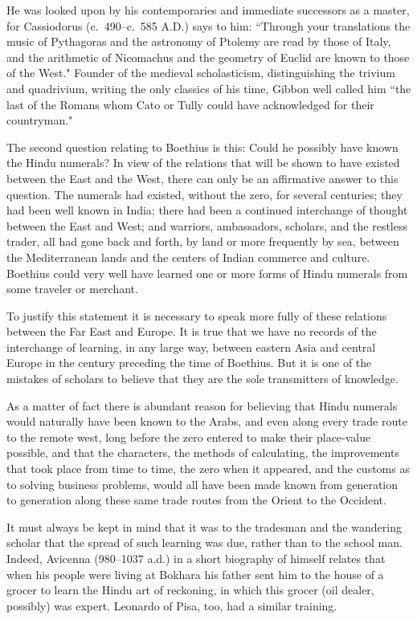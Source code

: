 \documentclass[11pt,a4paper]{article}
\begin{document}
He was looked upon by his contemporaries and immediate successors as a master, for Cassiodorus (c.~490--c.~585 A.D.) says to him: ``Through your translations the music of Pythagoras and the astronomy of Ptolemy are read by those of Italy, and the arithmetic of Nicomachus and the geometry of Euclid are known to those of the West." Founder of the medieval scholasticism, distinguishing the trivium and quadrivium, writing the only classics of his time, Gibbon well called him ``the last of the Romans whom Cato or Tully could have acknowledged for their countryman."

The second question relating to Boethius is this: Could he possibly have known the Hindu numerals? In view of the relations that will be shown to have existed between the East and the West, there can only be an affirmative answer to this question. The numerals had existed, without the zero, for several centuries; they had been well known in India; there had been a continued interchange of thought between the East and West; and warriors, ambassadors, scholars, and the restless trader, all had gone back and forth, by land or more frequently by sea, between the Mediterranean lands and the centers of Indian commerce and culture. Boethius could very well have learned one or more forms of Hindu numerals from some traveler or merchant.

To justify this statement it is necessary to speak more fully of these relations between the Far East and Europe. It is true that we have no records of the interchange of learning, in any large way, between eastern Asia and central Europe in the century preceding the time of Boethius. But it is one of the mistakes of scholars to believe that they are the sole transmitters of knowledge.

As a matter of fact there is abundant reason for believing that Hindu numerals would naturally have been known to the Arabs, and even along every trade route to the remote west, long before the zero entered to make their place-value possible, and that the characters, the methods of calculating, the improvements that took place from time to time, the zero when it appeared, and the customs as to solving business problems, would all have been made known from generation to generation along these same trade routes from the Orient to the Occident.

It must always be kept in mind that it was to the tradesman and the wandering scholar that the spread of such learning was due, rather than to the school man. Indeed, Avicenna (980--1037 a.d.) in a short biography of himself relates that when his people were living at Bokhara his father sent him to the house of a grocer to learn the Hindu art of reckoning, in which this grocer (oil dealer, possibly) was expert. Leonardo of Pisa, too, had a similar training.
\end{document}
